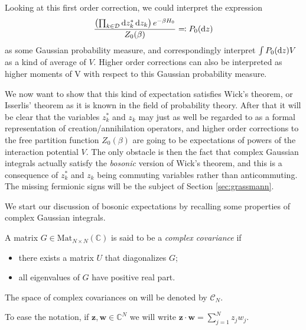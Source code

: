 Looking at this first order correction, we could interpret the expression
\begin{align*}
		\frac{\left(\prod_{k\in\mathcal{D}}\mathrm{d} z^*_k\,\mathrm{d} z_k\right)e^{-\beta H_0}}{Z_0(\beta)}
		\eqcolon P_0(\mathrm{d} z)
\end{align*}
as some Gaussian probability measure, and correspondingly interpret $\int P_0(\mathrm{d} z) V$ as a
kind of average of $V$. Higher order corrections can also be interpreted as higher moments of
V with respect to this Gaussian probability measure.

We now want to show that this kind of expectation satisfies Wick's theorem, or Isserlis' theorem
as it is known in the field of probability theory. After that it will be clear that the
variables $z^*_k$ and $z_k$ may just as well be regarded to as a formal representation of
creation/annihilation operators, and higher order corrections to the free partition function
$Z_0(\beta)$ are going to be expectations of powers of the interaction potential $V$. The only
obstacle is then the fact that complex Gaussian integrals actually satisfy the \textit{bosonic}
version of Wick's theorem, and this is a consequence of $z^*_k$ and $z_k$ being commuting
variables rather than anticommuting. The missing fermionic signs will be the subject of
Section \ref{sec:grassmann}.

We start our discussion of bosonic expectations by recalling some properties of complex
Gaussian integrals.

\begin{definition}
	A matrix $G\in\mathrm{Mat}_{N\times N}(\mathbb{C})$ is said to be a \textit{complex covariance} if
	\begin{itemize}
		\item[(i)] there exists a matrix $U$ that diagonalizes $G$;
		\item[(ii)] all eigenvalues of $G$ have positive real part.
	\end{itemize}
	The space of complex covariances on will be denoted by $\mathcal{C}_N$.
\end{definition}
To ease the notation, if $\boldsymbol{z},\boldsymbol{w}\in\mathbb{C}^N$ we will write
$\boldsymbol{z}\cdot \boldsymbol{w}=\sum_{j=1}^N z_j w_j$.

